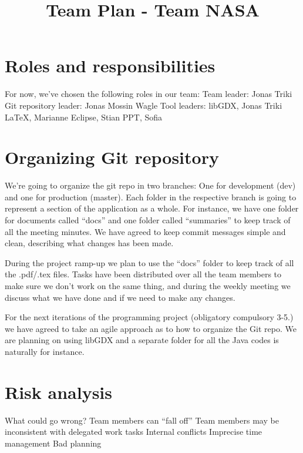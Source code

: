\documentclass{article}
\title{Team Plan - Team NASA}
\date{}
\begin{document}
\maketitle
\section*{Roles and responsibilities}
For now, we've chosen the following roles in our team:
\newline Team leader: Jonas Triki
\newline Git repository leader: Jonas Mossin Wagle
\newline Tool leaders:
\newline * libGDX, Jonas Triki
\newline * LaTeX, Marianne
\newline * Eclipse, Stian
\newline * PPT, Sofia

\section*{Organizing Git repository}

We’re going to organize the git repo in two branches: One for development (dev) and one for production (master). Each folder in the respective branch is going to represent a section of the application as a whole. For instance, we have one folder for documents called “docs” and one folder called “summaries” to keep track of all the meeting minutes. We have agreed to keep commit messages simple and clean, describing what changes has been made.

During the project ramp-up we plan to use the “docs” folder to keep track of all the .pdf/.tex files. Tasks have been distributed over all the team members to make sure we don’t work on the same thing, and during the weekly meeting we discuss what we have done and if we need to make any changes.

For the next iterations of the programming project (obligatory compulsory 3-5.) we have agreed to take an agile approach as to how to organize the Git repo. We are planning on using libGDX and a separate folder for all the Java codes is naturally for instance.

\section*{Risk analysis}
What could go wrong?
\newline * Team members can “fall off”
\newline * Team members may be inconsistent with delegated work tasks
\newline * Internal conflicts
\newline * Imprecise time management
\newline * Bad planning
\end{document}
